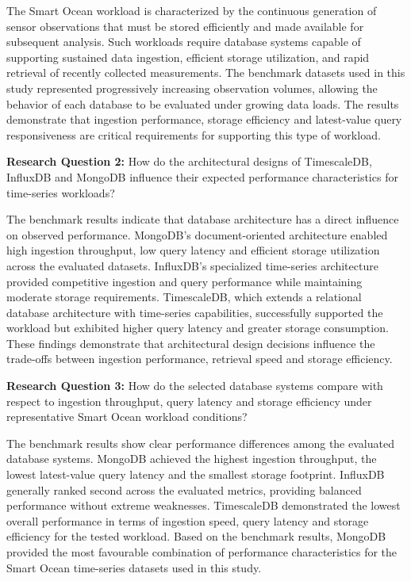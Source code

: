 The Smart Ocean workload is characterized by the continuous generation of sensor observations that must be stored efficiently and made available for subsequent analysis. Such workloads require database systems capable of supporting sustained data ingestion, efficient storage utilization, and rapid retrieval of recently collected measurements. The benchmark datasets used in this study represented progressively increasing observation volumes, allowing the behavior of each database to be evaluated under growing data loads. The results demonstrate that ingestion performance, storage efficiency and latest-value query responsiveness are critical requirements for supporting this type of workload.


\textbf{Research Question 2:} How do the architectural designs of TimescaleDB, InfluxDB and MongoDB influence their expected performance characteristics for time-series workloads?

The benchmark results indicate that database architecture has a direct influence on observed performance. MongoDB's document-oriented architecture enabled high ingestion throughput, low query latency and efficient storage utilization across the evaluated datasets. InfluxDB's specialized time-series architecture provided competitive ingestion and query performance while maintaining moderate storage requirements. TimescaleDB, which extends a relational database architecture with time-series capabilities, successfully supported the workload but exhibited higher query latency and greater storage consumption. These findings demonstrate that architectural design decisions influence the trade-offs between ingestion performance, retrieval speed and storage efficiency.


\textbf{ Research Question 3:} How do the selected database systems compare with respect to ingestion throughput, query latency and storage efficiency under representative Smart Ocean workload conditions?

The benchmark results show clear performance differences among the evaluated database systems. MongoDB achieved the highest ingestion throughput, the lowest latest-value query latency and the smallest storage footprint. InfluxDB generally ranked second across the evaluated metrics, providing balanced performance without extreme weaknesses. TimescaleDB demonstrated the lowest overall performance in terms of ingestion speed, query latency and storage efficiency for the tested workload. Based on the benchmark results, MongoDB provided the most favourable combination of performance characteristics for the Smart Ocean time-series datasets used in this study.

